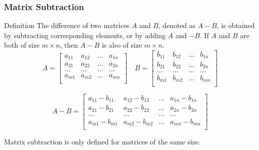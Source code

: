 \documentclass{beamer}
\begin{document}
\begin{frame}
  \frametitle{Matrix Subtraction}

  \begin{block}{Definition}
    The difference of two matrices \(A\) and \(B\), denoted as \(A - B\), is obtained by subtracting corresponding elements, or by adding $A$ and $-B$. If \(A\) and \(B\) are both of size \(m \times n\), then \(A - B\) is also of size \(m \times n\).
    \[
      A = \begin{bmatrix}
        a_{11} & a_{12} & \ldots & a_{1n} \\
        a_{21} & a_{22} & \ldots & a_{2n} \\
         \ldots & \ldots & \ldots & \ldots  \\
        a_{m1} & a_{m2} & \ldots & a_{mn} \\
      \end{bmatrix}
      \quad
      B = \begin{bmatrix}
        b_{11} & b_{12} & \ldots & b_{1n} \\
        b_{21} & b_{22} & \ldots & b_{2n} \\
        \ldots & \ldots & \ldots & \ldots  \\
        b_{m1} & b_{m2} & \ldots & b_{mn} \\
      \end{bmatrix}
    \]

    \[
      A - B = \begin{bmatrix}
        a_{11} - b_{11} & a_{12} - b_{12} & \ldots & a_{1n} - b_{1n} \\
        a_{21} - b_{21} & a_{22} - b_{22} & \ldots & a_{2n} - b_{2n} \\
         \ldots & \ldots & \ldots & \ldots \\
        a_{m1} - b_{m1} & a_{m2} - b_{m2} & \ldots & a_{mn} - b_{mn} \\
      \end{bmatrix}
    \]
  \end{block}

  \pause

    Matrix subtraction is only defined for matrices of the same size.

\end{frame}
\end{document}
